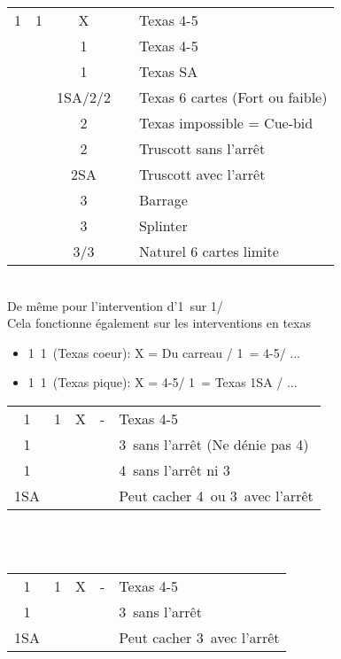 \documentclass[a4paper, oneside, 11pt]{report}
\begin{document}
		\begin{tabular}{cccc|l}
		1\trefle & 1\carreau & X && Texas 4-5\coeur\\
		&& 1\coeur && Texas 4-5\pique\\
		&& 1\pique && Texas SA\\
		&& 1SA/2\carreau/2\coeur && Texas 6 cartes (Fort ou faible)\\
		&& 2\trefle && Texas impossible = Cue-bid\\
		&& 2\pique && Truscott sans l'arrêt \carreau\\
		&& 2SA && Truscott avec l'arrêt \carreau\\
		&& 3\trefle && Barrage\\
		&& 3\carreau && Splinter\\
		&& 3\coeur/3\pique && Naturel 6 cartes limite\\
		\end{tabular}\\
		De même pour l'intervention d'1\coeur\ sur 1\trefle/\carreau\\

		Cela fonctionne également sur les interventions en texas
		\begin{itemize}
		\item 1\trefle\ 1\carreau\ (Texas coeur): X = Du carreau / 1\coeur\ = 4-5\pique / ...
		\item 1\trefle\ 1\coeur\ (Texas pique): X = 4-5\coeur / 1\pique\ = Texas 1SA / ...\\
		\end{itemize}

		\begin{tabular}{cccc|l}
		1\trefle & 1\carreau & X & - & Texas 4-5\coeur\\
		1\coeur &&&& 3\coeur\ sans l'arrêt (Ne dénie pas 4\pique)\\
		1\pique &&&& 4\pique\ sans l'arrêt ni 3\coeur\\
		1SA &&&& Peut cacher 4\pique\ ou 3\coeur\ avec l'arrêt \carreau\\
		\end{tabular}\\\\

		\begin{tabular}{cccc|l}
		1\trefle & 1\coeur & X & - & Texas 4-5\pique\\
		1\pique &&&& 3\pique\ sans l'arrêt\\
		1SA &&&& Peut cacher 3\pique\ avec l'arrêt \coeur\\
		\end{tabular}\\\\
		
\end{document}
